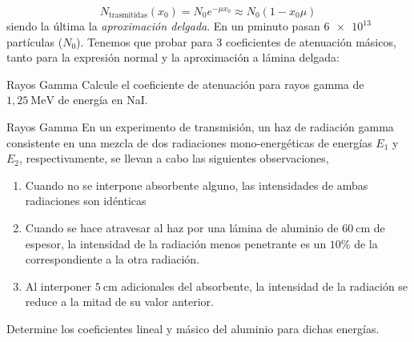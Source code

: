\begin{equation}
    N_{\text{trasmitidas}}(x_0)=N_0 e^{-\mu x_0} \approx N_0 (1-x_0\mu)
\end{equation}
siendo la última la \textit{aproximación delgada}. En un pminuto pasan $\SI{6e13}{}$ partículas ($N_0$). Tenemos que probar para 3 coeficientes de atenuación másicos, tanto para la expresión normal y la aproximación a lámina delgada: 

\begingroup
\makeatletter
\let\old@floatboxreset\@floatboxreset
\def\@floatboxreset{\old@floatboxreset\centering} %
\makeatother

\endgroup



\begin{Ejercicio}{Rayos Gamma}
Calcule el coeficiente de atenuación para rayos gamma de $1,25\ \text{MeV}$ de energía en NaI.
\end{Ejercicio}


\begin{Ejercicio}{Rayos Gamma}
En un experimento de transmisión, un haz de radiación gamma consistente en una mezcla de dos radiaciones mono-energéticas de energías $E_{1}$ y $E_{2}$, respectivamente, se llevan a cabo las siguientes observaciones,

\begin{enumerate}[label=\alph*)]
\item Cuando no se interpone absorbente alguno, las intensidades de ambas radiaciones son idénticas
\item Cuando se hace atravesar al haz por una lámina de aluminio de $60\ \text{cm}$ de espesor, la intensidad de la radiación menos penetrante es un $10\%$ de la correspondiente a la otra radiación.
\item Al interponer $5\ \text{cm}$ adicionales del absorbente, la intensidad de la radiación se reduce a la mitad de su valor anterior.
\end{enumerate}

Determine los coeficientes lineal y másico del aluminio para dichas energías.
\end{Ejercicio}

